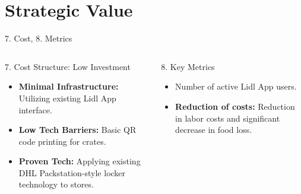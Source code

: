 \documentclass[aspectratio=169]{beamer}
\begin{document}
\section{Strategic Value}
\begin{frame}{7. Cost, 8. Metrics}
    \begin{columns}[t]
            \begin{block}{7. Cost Structure: Low Investment}
                \begin{itemize}
                    \item \textbf{Minimal Infrastructure:} Utilizing existing Lidl App interface.
                    \item \textbf{Low Tech Barriers:} Basic QR code printing for crates.
                    \item \textbf{Proven Tech:} Applying existing DHL Packstation-style locker technology to stores.
                \end{itemize}
            \end{block}
            
            \begin{block}{8. Key Metrics}
                \begin{itemize}
                    \item Number of active Lidl App users.
                    \item \textbf{Reduction of costs:} Reduction in labor costs and significant decrease in food loss.
                \end{itemize}
            \end{block}
    \end{columns}
\end{frame}
\end{document}
